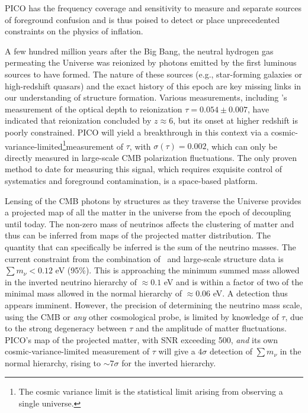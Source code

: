 \documentclass[PICOReport.tex]{subfiles}
\begin{document}
PICO has the frequency coverage and sensitivity to measure and separate sources of foreground confusion and is thus poised to detect or place unprecedented constraints on the physics of inflation. 

A few hundred million years after the Big Bang, the neutral hydrogen gas permeating the Universe was reionized by photons emitted by the first luminous sources to have formed.  The nature of these sources (e.g., star-forming galaxies or high-redshift quasars) and the exact history of this epoch are key missing links in our understanding of structure formation.  Various measurements, including \planck 's measurement of the optical depth to reionization $\tau = 0.054 \pm 0.007$, have indicated that reionization concluded by $z \approx 6$, but its onset at higher redshift is poorly constrained. PICO will yield a breakthrough in this context via a cosmic-variance-limited\footnote{The cosmic variance limit is the statistical limit arising from observing a single universe.}measurement of $\tau$, with $\sigma(\tau)=0.002$, which can only be directly measured in large-scale CMB polarization fluctuations.  The only proven method to date for measuring this signal, which requires exquisite control of systematics and foreground contamination, is a space-based platform.

Lensing of the CMB photons by structures as they traverse the Universe provides a projected map of all the matter in the universe from the epoch of decoupling until today.  The non-zero mass of neutrinos affects the clustering of matter and thus can be inferred from maps of the projected matter distribution. The quantity that can specifically be inferred is the sum of the neutrino masses.  The current constraint from the combination of \planck\ and large-scale structure data is $\sum m_{\nu} < 0.12$ eV (95\%).  This is approaching the minimum summed mass allowed in the inverted neutrino hierarchy of $\approx 0.1$ eV and is within a factor of two of the minimal mass allowed in the normal hierarchy of $\approx 0.06$ eV.  A detection thus appears imminent.  However, the precision of determining the neutrino mass scale, using the CMB or {\it any} other cosmological probe, is limited by knowledge of $\tau$, due to the strong degeneracy between $\tau$ and the amplitude of matter fluctuations.  PICO's map of the projected matter, with \ac{SNR} exceeding 500, {\it and} its own cosmic-variance-limited measurement of $\tau$ will give a $4\sigma$ detection of $\sum m_{\nu}$ in the normal hierarchy, rising to $\sim7\sigma$ for the inverted hierarchy. 
\end{document}
